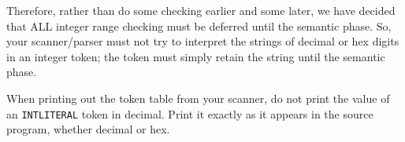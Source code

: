 Therefore, rather than do some checking earlier and some later, we
have decided that ALL integer range checking must be deferred until
the semantic phase.  So, your scanner/parser must not try to interpret
the strings of decimal or hex digits in an integer token; the token
must simply retain the string until the semantic phase.

When printing out the token table from your scanner, do not print the
value of an {\tt INTLITERAL} token in decimal.  Print it exactly as
it appears in the source program, whether decimal or hex.








